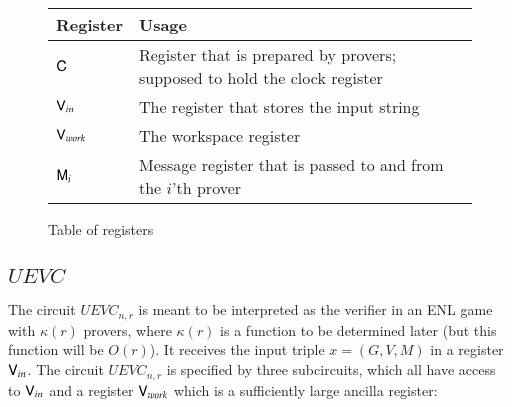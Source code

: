 \begin{figure}[H]
\begin{center}
    \begin{tabular}{ | l | p{10cm} |}
    \hline
    \textbf{Register} & \textbf{Usage}\\ \hline
    ${\mathsf{C}}$			& Register that is prepared by provers; supposed to hold the clock register 			\\ \hline
    ${\mathsf{V}}_{in}$ 		& The register that stores the input string 	 \\ \hline
    ${\mathsf{V}}_{work}$	& The workspace register 									\\ \hline
    ${\mathsf{M}}_i$			& Message register that is passed to and from  the $i$'th prover	  \\ \hline
    \end{tabular}
\end{center}
\caption{Table of registers}
\end{figure}

\subsection{$UEVC$}

\label{sec:specs}

The circuit $UEVC_{n,r}$ is meant to be interpreted as the verifier in an ENL game with $\kappa(r)$ provers, where $\kappa(r)$ is a function to be determined later (but this function will be $O(r)$). It receives the input triple $x = (G,V,M)$ in a register ${\mathsf{V}}_{in}$. The circuit $UEVC_{n,r}$ is specified by three subcircuits, which all have access to ${\mathsf{V}}_{in}$ and a register ${\mathsf{V}}_{work}$ which is a sufficiently large ancilla register:

